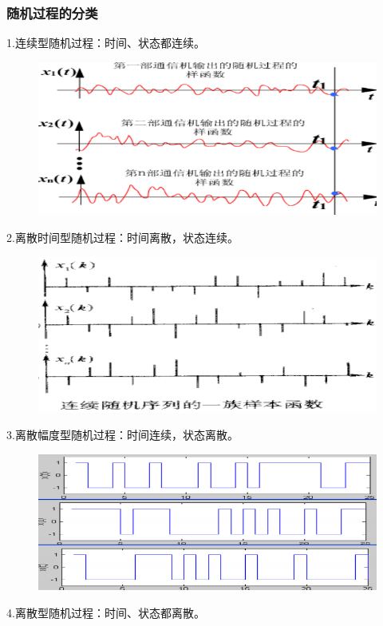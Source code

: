 \documentclass[UTF8]{ctexart} %
\begin{document}
			\subsubsection{随机过程的分类}
				1.连续型随机过程：时间、状态都连续。
				\begin{figure}[H]
					\centering\includegraphics[scale=0.3]{4.png}
				\end{figure}
				2.离散时间型随机过程：时间离散，状态连续。
				\begin{figure}[H]
					\centering\includegraphics[scale=0.3]{5.png}
				\end{figure}
				3.离散幅度型随机过程：时间连续，状态离散。
				\begin{figure}[H]
					\centering\includegraphics[scale=0.3]{6.png}
				\end{figure}
				4.离散型随机过程：时间、状态都离散。
\end{document}
